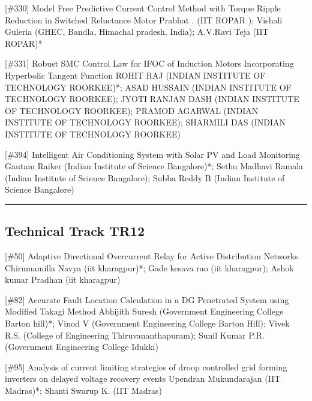 {} \begin{abstract_online} {[\#330] Model Free Predictive Current Control Method with Torque Ripple Reduction in Switched Reluctance Motor} {} {Prabhat . (IIT ROPAR ); Vishali  Guleria (GHEC, Bandla, Himachal pradesh, India); A.V.Ravi Teja (IIT ROPAR)*} {}  \end{abstract_online} 
{} \begin{abstract_online} {[\#331] Robust SMC Control Law for IFOC of Induction Motors Incorporating Hyperbolic Tangent Function} {} {ROHIT RAJ (INDIAN INSTITUTE OF TECHNOLOGY ROORKEE)*; ASAD HUSSAIN (INDIAN INSTITUTE OF TECHNOLOGY ROORKEE); JYOTI RANJAN DASH (INDIAN INSTITUTE OF TECHNOLOGY ROORKEE); PRAMOD AGARWAL (INDIAN INSTITUTE OF TECHNOLOGY ROORKEE); SHARMILI  DAS (INDIAN INSTITUTE OF TECHNOLOGY ROORKEE)} {}  \end{abstract_online} 
{} \begin{abstract_online} {[\#394] Intelligent Air Conditioning System with Solar PV and Load Monitoring} {} {Gautam Raiker (Indian Institute of Science Bangalore)*; Sethu Madhavi  Ramala (Indian Institute of Science Bangalore); Subba  Reddy B (Indian Institute of Science Bangalore)} {}  \end{abstract_online} 
\hrule  \subsection{Technical Track TR12}\nopagebreak {} \begin{abstract_online} {[\#50] Adaptive Directional Overcurrent Relay for Active Distribution Networks} {} {Chirumamilla Navya (iit kharagpur)*; Gade kesava rao (iit kharagpur); Ashok kumar Pradhan (iit kharagpur)} {}  \end{abstract_online} 
{} \begin{abstract_online} {[\#82] Accurate Fault Location Calculation in a DG Penetrated System using Modified Takagi Method} {} {Abhijith Suresh (Government Engineering College Barton hill)*; Vinod V (Government Engineering College Barton Hill); Vivek R.S. (College of Engineering Thiruvananthapuram); Sunil Kumar P.R. (Government Engineering College Idukki)} {}  \end{abstract_online} 
{} \begin{abstract_online} {[\#95] Analysis of current limiting strategies of droop controlled grid forming inverters on delayed voltage recovery events} {} {Upendran Mukundarajan (IIT Madras)*; Shanti Swarup K. (IIT Madras)} {}  \end{abstract_online} 
